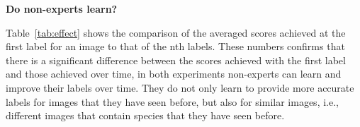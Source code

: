 \noindent
\textbf{Do non-experts learn?}
%
\begin{table}[t!]
\centering
\caption{The impact of learning over time. 
Wilcoxon rank-sum test is used for significance testing.
All comparisons are between the first label and the $nth$ label.}
\label{tab:effect}
\end{table}
%
%
Table~\ref{tab:effect} shows the comparison of the averaged scores achieved 
at the first label for an image to that of  the nth labels.
%
These numbers %
confirms that there is a significant difference 
between the scores achieved with the first label and those achieved over time, in both 
experiments non-experts can learn and improve their labels over time. 
They do not only learn to provide more accurate labels for images that they have seen 
before, but also for similar images, i.e., different images that contain species that they have seen before. 


